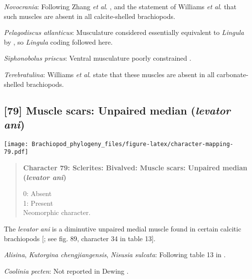 \documentclass[openany]{book}
\theoremstyle{definition}
\theoremstyle{definition}
\theoremstyle{definition}
\theoremstyle{remark}
\begin{document}
\hypertarget{Novocrania-coding-78}{}
\emph{Novocrania}: Following Zhang \emph{et al}.
\citeyearpar{Zhang2014Anearly}, and the statement of Williams \emph{et
al}. \citeyearpar{Williams2000LinguliformeaCraniiformea} that such
muscles are absent in all calcite-shelled brachiopods.

\hypertarget{Pelagodiscus_atlanticus-coding-78}{}
\emph{Pelagodiscus atlanticus}: Musculature considered essentially
equivalent to \emph{Lingula} by
\citet{Williams2000LinguliformeaCraniiformea}, so \emph{Lingula} coding
followed here.

\hypertarget{Siphonobolus_priscus-coding-78}{}
\emph{Siphonobolus priscus}: Ventral musculature poorly constrained
\citep{Williams2000LinguliformeaCraniiformea, Popov2009Earlyontogeny}.

\hypertarget{Terebratulina-coding-78}{}
\emph{Terebratulina}: Williams \emph{et al}.
\citeyearpar[p.~32]{Williams2000LinguliformeaCraniiformea} state that
these muscles are absent in all carbonate-shelled brachiopods.

\subsection*{\texorpdfstring{{[}79{]} Muscle scars: Unpaired median
(\emph{levator
ani})}{{[}79{]} Muscle scars: Unpaired median (levator ani)}}\label{muscle-scars-unpaired-median-levator-ani}

\texttt{[image: Brachiopod\_phylogeny\_files/figure-latex/character-mapping-79.pdf]}

\begin{quote}
\textbf{Character 79: Sclerites: Bivalved: Muscle scars: Unpaired median
(\emph{levator ani})}

0: Absent\\
1: Present\\
Neomorphic character.
\end{quote}

The \emph{levator ani} is a diminutive unpaired medial muscle found in
certain calcitic brachiopods
{[}\citet{Williams2000LinguliformeaCraniiformea}; see fig. 89, character
34 in table 13{]}.

\hypertarget{Alisina-coding-79}{}
\emph{Alisina}, \emph{Kutorgina chengjiangensis}, \emph{Nisusia
sulcata}: Following table 13 in
\citet{Williams2000LinguliformeaCraniiformea}.

\hypertarget{Coolinia_pecten-coding-79}{}
\emph{Coolinia pecten}: Not reported in Dewing
\citeyearpar{Dewing2001Hingemodifications}.
\end{document}
